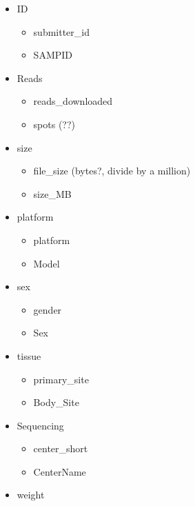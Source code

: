\documentclass[11pt]{article}
\providecommand{\tightlist}{%
      \setlength{\itemsep}{0pt}\setlength{\parskip}{0pt}}
\begin{document}
\begin{itemize}
\tightlist
\item
  ID

  \begin{itemize}
  \tightlist
  \item
    submitter\_id
  \item
    SAMPID
  \end{itemize}
\item
  Reads

  \begin{itemize}
  \tightlist
  \item
    reads\_downloaded
  \item
    spots (??)
  \end{itemize}
\item
  size

  \begin{itemize}
  \tightlist
  \item
    file\_size (bytes?, divide by a million)
  \item
    size\_MB
  \end{itemize}
\item
  platform

  \begin{itemize}
  \tightlist
  \item
    platform
  \item
    Model
  \end{itemize}
\item
  sex

  \begin{itemize}
  \tightlist
  \item
    gender
  \item
    Sex
  \end{itemize}
\item
  tissue

  \begin{itemize}
  \tightlist
  \item
    primary\_site
  \item
    Body\_Site
  \end{itemize}
\item
  Sequencing

  \begin{itemize}
  \tightlist
  \item
    center\_short
  \item
    CenterName
  \end{itemize}
\item
  weight


\end{itemize}
\end{document}
